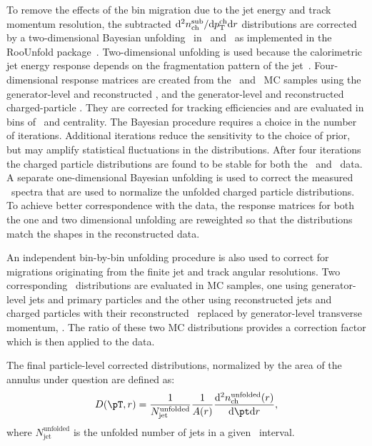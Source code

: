 
To remove the effects of the bin migration due to the jet energy and track momentum resolution, the subtracted $\mathrm{d}^2 \mbox{$n_{\mathrm{ch}}^{\mathrm{sub}}$} /\mathrm{d}\mbox{$p_{\mathrm{T}}^{\mathrm{ch}}$} \mathrm{d} r$ distributions are corrected by a two-dimensional Bayesian unfolding~\cite{DAgostini:1994zf}
in \pttrk\ and \ptjet\ as implemented in the RooUnfold package~\cite{Adye:2011gm}.  
Two-dimensional unfolding is used because the calorimetric jet energy response depends on the fragmentation pattern of the jet~\cite{Aad:2011he}.
Four-dimensional response matrices are created from the \pp\ and \pbpb\ MC samples using the generator-level and reconstructed \ptjet, and the generator-level and reconstructed charged-particle \pttrk. They are corrected for tracking efficiencies and are evaluated in bins of \rvar\ and centrality. The Bayesian procedure requires a choice in the number of iterations.
Additional iterations reduce the sensitivity to the choice of prior, but may
amplify statistical fluctuations in the distributions.
After four iterations the 
charged particle distributions are found to be stable for both the \PbPb\ and \pp\ data.
A separate one-dimensional Bayesian unfolding is used to correct the measured \ptjet\ spectra that are used to normalize the unfolded charged particle distributions.
To achieve better correspondence with the data, the response matrices for both the one and two dimensional unfolding are reweighted so that the distributions match the shapes in the reconstructed data.

An independent bin-by-bin unfolding procedure is also used to correct for migrations originating from the finite jet and track angular resolutions. Two corresponding \Dptr\ distributions are evaluated in MC samples, one using generator-level jets and primary particles and the other using reconstructed jets and charged particles with their reconstructed \pt\ replaced by generator-level transverse momentum, \pTtrue. The ratio of these two MC distributions provides a correction factor which is then applied to the data. 

The final particle-level corrected distributions, normalized by the area of the annulus under question are defined as:
\begin{align*}
   \Dptr = \frac{1}{N_\mathrm{jet}^\mathrm{unfolded}} \frac{1}{A(r)} \frac{\fd^2 \nchunf(r)}{\fd \pt \fd r},
 \end{align*}
where $\textit{N}_{\text{jet}}^{\text{unfolded}}$ is the unfolded number of jets in a given \ptjet\ interval.


